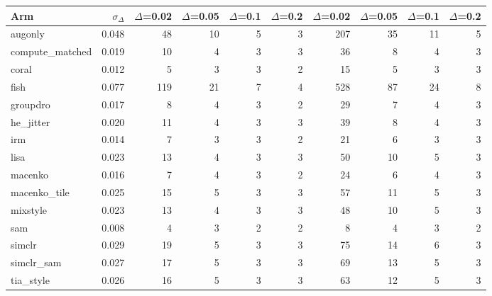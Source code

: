\begin{tabular}{lrrrrrrrrr}
\toprule
Arm & $\sigma_\Delta$ & $\Delta$=0.02 & $\Delta$=0.05 & $\Delta$=0.1 & $\Delta$=0.2 & $\Delta$=0.02 & $\Delta$=0.05 & $\Delta$=0.1 & $\Delta$=0.2 \\
\midrule
augonly & 0.048 & 48 & 10 & 5 & 3 & 207 & 35 & 11 & 5 \\
compute\_matched & 0.019 & 10 & 4 & 3 & 3 & 36 & 8 & 4 & 3 \\
coral & 0.012 & 5 & 3 & 3 & 2 & 15 & 5 & 3 & 3 \\
fish & 0.077 & 119 & 21 & 7 & 4 & 528 & 87 & 24 & 8 \\
groupdro & 0.017 & 8 & 4 & 3 & 2 & 29 & 7 & 4 & 3 \\
he\_jitter & 0.020 & 11 & 4 & 3 & 3 & 39 & 8 & 4 & 3 \\
irm & 0.014 & 7 & 3 & 3 & 2 & 21 & 6 & 3 & 3 \\
lisa & 0.023 & 13 & 4 & 3 & 3 & 50 & 10 & 5 & 3 \\
macenko & 0.016 & 7 & 4 & 3 & 2 & 24 & 6 & 4 & 3 \\
macenko\_tile & 0.025 & 15 & 5 & 3 & 3 & 57 & 11 & 5 & 3 \\
mixstyle & 0.023 & 13 & 4 & 3 & 3 & 48 & 10 & 5 & 3 \\
sam & 0.008 & 4 & 3 & 2 & 2 & 8 & 4 & 3 & 2 \\
simclr & 0.029 & 19 & 5 & 3 & 3 & 75 & 14 & 6 & 3 \\
simclr\_sam & 0.027 & 17 & 5 & 3 & 3 & 69 & 13 & 5 & 3 \\
tia\_style & 0.026 & 16 & 5 & 3 & 3 & 63 & 12 & 5 & 3 \\
\bottomrule
\end{tabular}
